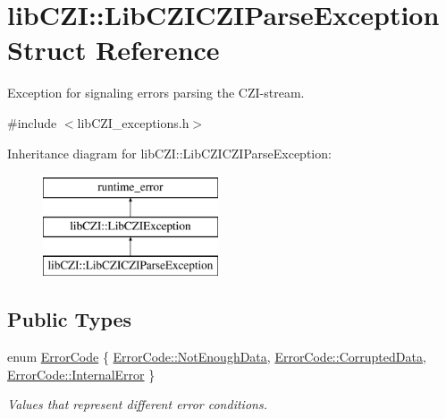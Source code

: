 \hypertarget{structlib_c_z_i_1_1_lib_c_z_i_c_z_i_parse_exception}{}\section{lib\+C\+ZI\+:\+:Lib\+C\+Z\+I\+C\+Z\+I\+Parse\+Exception Struct Reference}
\label{structlib_c_z_i_1_1_lib_c_z_i_c_z_i_parse_exception}


Exception for signaling errors parsing the C\+Z\+I-\/stream.  




{\ttfamily \#include $<$lib\+C\+Z\+I\+\_\+exceptions.\+h$>$}

Inheritance diagram for lib\+C\+ZI\+:\+:Lib\+C\+Z\+I\+C\+Z\+I\+Parse\+Exception\+:\begin{figure}[H]
\begin{center}
\leavevmode
\includegraphics[height=3.000000cm]{structlib_c_z_i_1_1_lib_c_z_i_c_z_i_parse_exception}
\end{center}
\end{figure}
\subsection*{Public Types}
\begin{DoxyCompactItemize}
\item 
enum \hyperlink{structlib_c_z_i_1_1_lib_c_z_i_c_z_i_parse_exception_a32a6c8ab31a657e490e5c605c97efb40}{Error\+Code} \{ \hyperlink{structlib_c_z_i_1_1_lib_c_z_i_c_z_i_parse_exception_a32a6c8ab31a657e490e5c605c97efb40ab6e495eeaee7cdf1bac313472e4681ac}{Error\+Code\+::\+Not\+Enough\+Data}, 
\hyperlink{structlib_c_z_i_1_1_lib_c_z_i_c_z_i_parse_exception_a32a6c8ab31a657e490e5c605c97efb40a14ce06721aa54faf8e86a779a37ada3f}{Error\+Code\+::\+Corrupted\+Data}, 
\hyperlink{structlib_c_z_i_1_1_lib_c_z_i_c_z_i_parse_exception_a32a6c8ab31a657e490e5c605c97efb40a8462b58246e70e5c83e5b939a9332cb5}{Error\+Code\+::\+Internal\+Error}
 \}\begin{DoxyCompactList}\small\item\em Values that represent different error conditions. \end{DoxyCompactList}
\end{DoxyCompactItemize}
